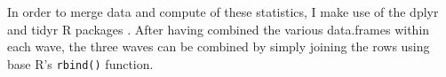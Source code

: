 \documentclass[a4paper,british]{article}\usepackage[]{graphicx}\usepackage[]{color}
\newcommand{\code}[1]{\texttt{#1}}
\begin{document}
In order to merge data and compute of these statistics, I make use
of the dplyr and tidyr R packages \citet{wickham2015dplyr,wickham2016tidyr}.
After having combined the various data.frames within each wave, the
three waves can be combined by simply joining the rows using base
R's \code{rbind()} function\citep{R}.

\end{document}

